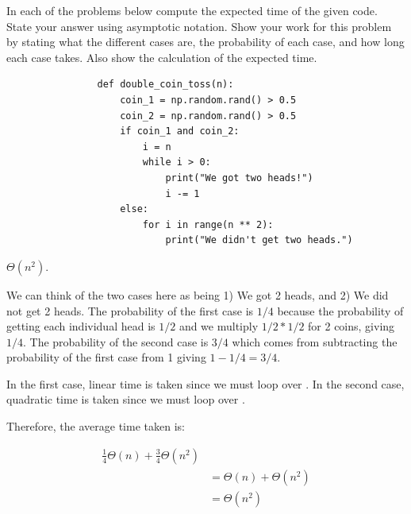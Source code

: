 \begin{prob}
    In each of the problems below compute the expected time of the given code.
    State your answer using asymptotic notation. Show your work for this
    problem by stating what the different cases are, the probability of each
    case, and how long each case takes. Also show the calculation of the
    expected time.

    \begin{subprobset}
        \begin{subprob}
            \begin{verbatim}
                def double_coin_toss(n):
                    coin_1 = np.random.rand() > 0.5
                    coin_2 = np.random.rand() > 0.5
                    if coin_1 and coin_2:
                        i = n
                        while i > 0:
                            print("We got two heads!")
                            i -= 1
                    else:
                        for i in range(n ** 2):
                            print("We didn't get two heads.")

            \end{verbatim}

            \begin{soln}
                $\Theta(n^{2})$.

                We can think of the two cases here as being 1) We got 2 heads, and 2) We did not get 2 heads.
                The probability of the first case is $1/4$ because the probability of getting each individual
                head is $1/2$ and we multiply $1/2 * 1/2$ for 2 coins, giving $1/4$.
                The probability of the second case is $3/4$ which comes from subtracting the probability of the
                first case from 1 giving $1 - 1/4 = 3/4$.

                In the first case, linear time is taken since we must loop over .
                In the second case, quadratic time is taken since we must loop over .

                Therefore, the average time taken is:

                \begin{align*}
                    \frac{1}{4} \Theta(n) + \frac{3}{4} \Theta(n^2)\\
                    &=
                    \Theta(n) + \Theta(n^2)\\
                    &=
                    \Theta(n^{2})
                \end{align*}


\end{soln}
\end{subprob}
\end{subprobset}
\end{prob}
